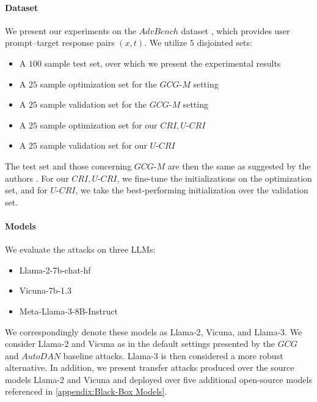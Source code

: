 \paragraph{Dataset}
We present our experiments on the $AdvBench$ dataset \cite{zou2023universal}, which provides user prompt--target response pairs $(x, t)$. 
We utilize $5$ disjointed sets:
\begin{itemize}
    \item A $100$ sample test set, over which we present the experimental results
    \item A $25$ sample optimization set for the $GCG\text{-}M$ setting
    \item A $25$ sample validation set for the $GCG\text{-}M$ setting
    \item A $25$ sample optimization set for our $CRI,U\text{-}CRI$
    \item A $25$ sample validation set for our $U\text{-}CRI$
\end{itemize}
The test set and those concerning $GCG\text{-}M$ are then the same as suggested by the authors \citet{zou2023universal}. For our $CRI,U\text{-}CRI$, we fine-tune the initializations on the optimization set, and for $U\text{-}CRI$, we take the best-performing initialization over the validation set.


\paragraph{Models}
We evaluate the attacks on three LLMs:
\begin{itemize}
    \item Llama-2-7b-chat-hf \cite{touvron2023llama}
    \item Vicuna-7b-1.3 \cite{vicuna2023}
    \item Meta-Llama-3-8B-Instruct \cite{meta2024llama3}
\end{itemize}
We correspondingly denote these models as Llama-2, Vicuna, and Llama-3. We consider Llama-2 and Vicuna as in the default settings presented by the $GCG$ and $AutoDAN$ baseline attacks. Llama-3 is then considered a more robust alternative. In addition, we present transfer attacks produced over the source models Llama-2 and Vicuna and deployed over five additional open-source models referenced in \cref{appendix:Black-Box Models}.




